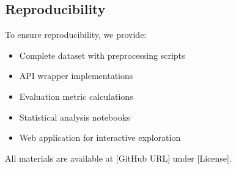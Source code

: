 \subsection{Reproducibility}

To ensure reproducibility, we provide:
\begin{itemize}
    \item Complete dataset with preprocessing scripts
    \item API wrapper implementations
    \item Evaluation metric calculations
    \item Statistical analysis notebooks
    \item Web application for interactive exploration
\end{itemize}

All materials are available at [GitHub URL] under [License].
